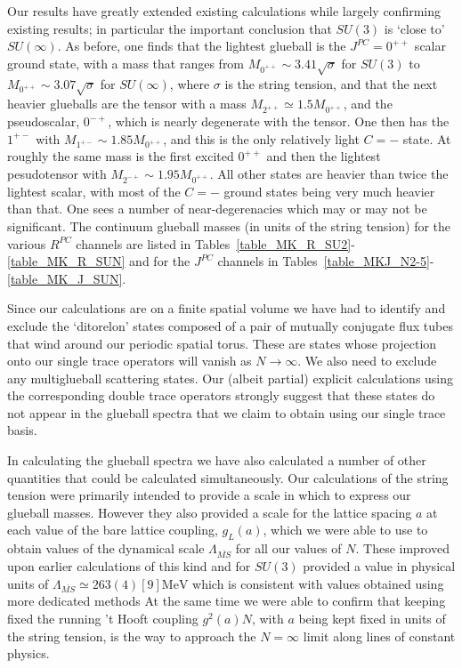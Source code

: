 \documentclass[12pt]{article}
\begin{document}
Our results have greatly extended existing calculations while largely confirming existing
results; in particular the important conclusion that $SU(3)$ is `close to' $SU(\infty)$.
As before, one finds that the lightest glueball is the $J^{PC}=0^{++}$ scalar ground state,
with a mass that ranges from $M_{0^{++}}\sim 3.41\surd\sigma$ for $SU(3)$ to
$M_{0^{++}}\sim 3.07\surd\sigma$ for $SU(\infty)$, where $\sigma$ is the string tension,
and that the next heavier glueballs are the tensor with a mass $M_{2^{++}} \simeq 1.5 M_{0^{++}}$,
and the pseudoscalar, $0^{-+}$, which is nearly degenerate with the tensor. One then
has the $1^{+-}$ with $M_{1^{+-}} \sim 1.85 M_{0^{++}}$, and this is the only relatively light
$C=-$ state. At roughly the same mass is the first excited $0^{++}$ and then the lightest
pesudotensor with $M_{2^{-+}} \sim 1.95 M_{0^{++}}$. All other states are heavier than twice
the lightest scalar, with most of the $C=-$ ground states being very much heavier than that.
One sees a number of near-degerenacies which may or may not be significant.
The continuum glueball masses (in units of the string tension) for the various $R^{PC}$
channels are listed in Tables~\ref{table_MK_R_SU2}-\ref{table_MK_R_SUN} and for the
$J^{PC}$ channels in Tables~\ref{table_MKJ_N2-5}-\ref{table_MK_J_SUN}.

Since our calculations are on a finite spatial volume we have had to identify and exclude
the `ditorelon' states composed of a pair of mutually conjugate flux tubes that wind
around our periodic spatial torus. These are states whose projection onto our single
trace operators will vanish as $N\to\infty$. We also need to exclude any multiglueball
scattering states. Our (albeit partial) explicit calculations using the corresponding
double trace operators strongly suggest that these states do not appear in the glueball
spectra that we claim to obtain using our single trace basis.

In calculating the glueball spectra we have also calculated a number of other quantities
that could be calculated simultaneously. Our calculations of the string tension were
primarily intended to provide a scale in which to express our glueball masses.
However they also provided a scale for the lattice spacing $a$ at each value of the
bare lattice coupling, $g_L(a)$, which we were able to use to obtain values of the
dynamical scale $\Lambda_{\overline{MS}}$ for all our values of $N$. These improved
upon earlier calculations of this kind
and for $SU(3)$ provided a value in physical units of
$\Lambda_{\overline{MS}} \simeq 263(4)[9]{\mathrm{MeV}}$ which
is consistent with values obtained using more dedicated methods
At the same time we were able to confirm that keeping fixed the running 't Hooft coupling 
$g^2(a)N$, with $a$ being kept fixed in units of the string tension, is the way to
approach the $N=\infty$ limit along lines of constant physics.
\end{document}
